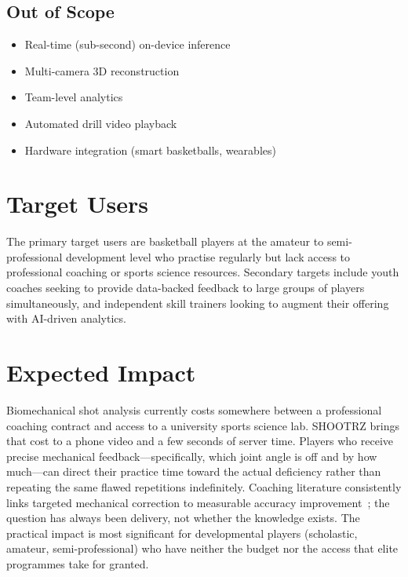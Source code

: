 \subsection{Out of Scope}

\begin{itemize}
  \item Real-time (sub-second) on-device inference
  \item Multi-camera 3D reconstruction
  \item Team-level analytics
  \item Automated drill video playback
  \item Hardware integration (smart basketballs, wearables)
\end{itemize}

\section{Target Users}
\label{sec:users}

The primary target users are basketball players at the amateur to semi-professional development level who practise regularly but lack access to professional coaching or sports science resources. Secondary targets include youth coaches seeking to provide data-backed feedback to large groups of players simultaneously, and independent skill trainers looking to augment their offering with AI-driven analytics.

\section{Expected Impact}
\label{sec:impact}

Biomechanical shot analysis currently costs somewhere between a professional coaching contract and access to a university sports science lab. SHOOTRZ brings that cost to a phone video and a few seconds of server time. Players who receive precise mechanical feedback---specifically, which joint angle is off and by how much---can direct their practice time toward the actual deficiency rather than repeating the same flawed repetitions indefinitely. Coaching literature consistently links targeted mechanical correction to measurable accuracy improvement~\cite{Cabarkapa2021}; the question has always been delivery, not whether the knowledge exists. The practical impact is most significant for developmental players (scholastic, amateur, semi-professional) who have neither the budget nor the access that elite programmes take for granted.

